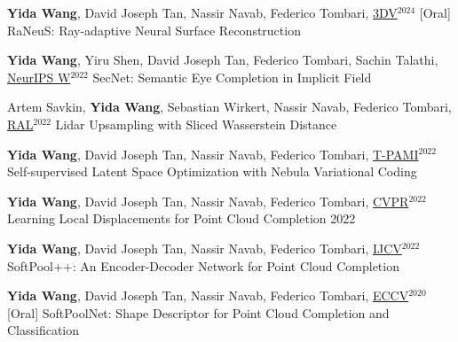 \begin{cventries}
\begin{enumerate}[label={[\arabic*]}, leftmargin=*]

\item
\cvpublication
{\textbf{Yida Wang}, David Joseph Tan, Nassir Navab, Federico Tombari, \underline{3DV}$^{2024}$ [Oral]} %
{RaNeuS: Ray-adaptive Neural Surface Reconstruction} %
{} %
{} %

\item
\cvpublication
{\textbf{Yida Wang}, Yiru Shen, David Joseph Tan, Federico Tombari, Sachin Talathi, \underline{NeurIPS W}$^{2022}$} %
{SecNet: Semantic Eye Completion in Implicit Field} %
{} %
{} %

\item
\cvpublication
{Artem Savkin, \textbf{Yida Wang}, Sebastian Wirkert, Nassir Navab, Federico Tombari, \underline{RAL}$^{2022}$} %
{Lidar Upsampling with Sliced Wasserstein Distance} %
{} %
{} %

\item
\cvpublication
{\textbf{Yida Wang}, David Joseph Tan, Nassir Navab, Federico Tombari, \underline{T-PAMI}$^{2022}$} %
{Self-supervised Latent Space Optimization with Nebula Variational Coding} %
{} %
{} %

\item
\cvpublication
{\textbf{Yida Wang}, David Joseph Tan, Nassir Navab, Federico Tombari, \underline{CVPR}$^{2022}$}
{Learning Local Displacements for Point Cloud Completion} %
{2022} %
{} %
{} %

\item
\cvpublication
{\textbf{Yida Wang}, David Joseph Tan, Nassir Navab, Federico Tombari, \underline{IJCV}$^{2022}$} %
{SoftPool++: An Encoder-Decoder Network for Point Cloud Completion} %
{} %
{} %

\item
\cvpublication
{\textbf{Yida Wang}, David Joseph Tan, Nassir Navab, Federico Tombari, \underline{ECCV}$^{2020}$ [Oral] \href{https://www.youtube.com/watch?v=zw4NlyxWlBg}{}} %
{SoftPoolNet: Shape Descriptor for Point Cloud Completion and Classification} %
{} %
{} %


\end{enumerate}
\end{cventries}
